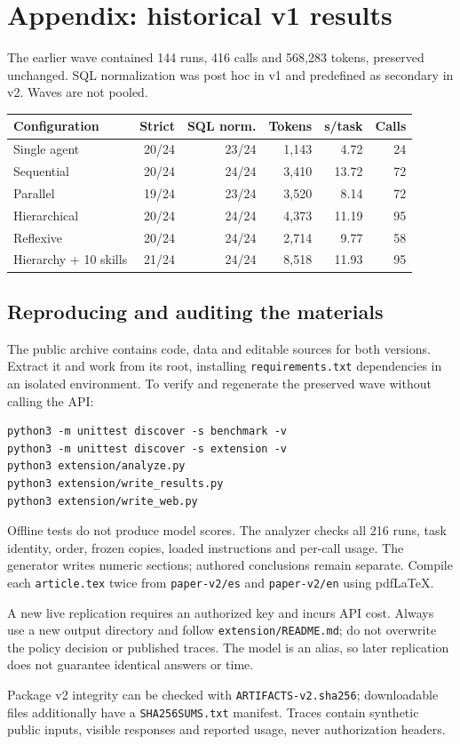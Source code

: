 \clearpage
\section*{Appendix: historical v1 results}
The earlier wave contained 144 runs, 416 calls and 568,283 tokens, preserved unchanged. SQL normalization was post hoc in v1 and predefined as secondary in v2. Waves are not pooled.
\begin{center}\small
\setlength{\tabcolsep}{4pt}
\begin{tabularx}{\linewidth}{@{}Xrrrrr@{}}
\toprule Configuration & Strict & SQL norm. & Tokens & s/task & Calls \\ \midrule
Single agent & 20/24 & 23/24 & 1,143 & 4.72 & 24 \\
Sequential & 20/24 & 24/24 & 3,410 & 13.72 & 72 \\
Parallel & 19/24 & 23/24 & 3,520 & 8.14 & 72 \\
Hierarchical & 20/24 & 24/24 & 4,373 & 11.19 & 95 \\
Reflexive & 20/24 & 24/24 & 2,714 & 9.77 & 58 \\
Hierarchy + 10 skills & 21/24 & 24/24 & 8,518 & 11.93 & 95 \\
\bottomrule
\end{tabularx}\end{center}

\subsection*{Reproducing and auditing the materials}
The public archive contains code, data and editable sources for both versions. Extract it and work from its root, installing \texttt{requirements.txt} dependencies in an isolated environment. To verify and regenerate the preserved wave without calling the API:
\begin{verbatim}
python3 -m unittest discover -s benchmark -v
python3 -m unittest discover -s extension -v
python3 extension/analyze.py
python3 extension/write_results.py
python3 extension/write_web.py
\end{verbatim}
Offline tests do not produce model scores. The analyzer checks all 216 runs, task identity, order, frozen copies, loaded instructions and per-call usage. The generator writes numeric sections; authored conclusions remain separate. Compile each \texttt{article.tex} twice from \texttt{paper-v2/es} and \texttt{paper-v2/en} using pdfLaTeX.

A new live replication requires an authorized key and incurs API cost. Always use a new output directory and follow \texttt{extension/README.md}; do not overwrite the policy decision or published traces. The model is an alias, so later replication does not guarantee identical answers or time.

Package v2 integrity can be checked with \texttt{ARTIFACTS-v2.sha256}; downloadable files additionally have a \texttt{SHA256SUMS.txt} manifest. Traces contain synthetic public inputs, visible responses and reported usage, never authorization headers.
